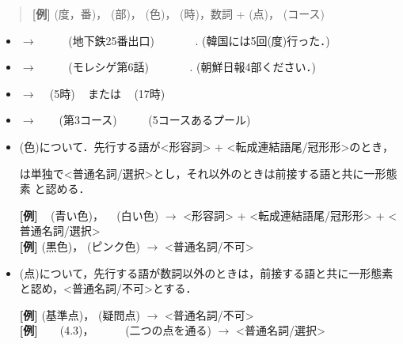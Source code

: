 \begin{description}
\begin{quote}
{\bf [例]} 
(度，番)，
(部)，
(色)，
(時)，数詞 + 
(点)，
(コース)
\end{quote}

\begin{itemize}
\item {}
 $\longrightarrow$ 
\ 
\ 
\ 
 (地下鉄25番出口)
\ 
\ 
\ 
\ 
. (韓国には5回(度)行った．)
\item {}
 $\longrightarrow$ 
\ 
\ 
\ 
 (モレシゲ第6話)
\ 
\ 
\ 
\ 
. (朝鮮日報4部ください．)
\item {}
 $\longrightarrow$ 
\ 
 (5時)
\ 
 または 
\ 
 (17時)
\item {}
 $\longrightarrow$ 
\ 
\ 
 (第3コース)
\ 
\ 
\ 
 (5コースあるプール)

\item
{}
(色)について．先行する語が<形容詞> + <転成連結語尾/冠形形>のとき，

は単独で<普通名詞/選択>とし，それ以外のときは前接する語と共に一形態素
と認める．
\vspace{\baselineskip}

{\bf [例]} 
\ 
(青い色)，
\ 
(白い色) $\longrightarrow$ 
<形容詞> + <転成連結語尾/冠形形> + 
<普通名詞/選択>\\
{\bf [例]} 
(黒色)，
(ピンク色) $\longrightarrow$ <普通名詞/不可>
\vspace{\baselineskip}

\item
{}
(点)について，先行する語が数詞以外のときは，前接する語と共に一形態素
と認め，<普通名詞/不可>とする．
\vspace{\baselineskip}

  {\bf [例]} 
(基準点)，
(疑問点)
             $\longrightarrow$ <普通名詞/不可>\\
  {\bf [例]} 
\ 
\ 
(4.3)，
\ 
\ 
\ 
(二つの点を通る)
             $\longrightarrow$ <普通名詞/選択>

\end{itemize}


\end{description}



